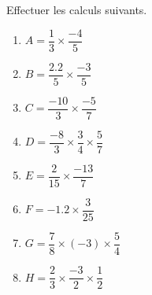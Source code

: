 \begin{exercice*}
    Effectuer les calculs suivants.
    \begin{spacing}{2}
        \begin{multicols}{2}
            \begin{enumerate}
                \item $A=\dfrac{1}{3}\times\dfrac{-4}{5}$
                \item $B=\dfrac{\num{2.2}}{5}\times\dfrac{-3}{5}$
                \item $C=\dfrac{-10}{3}\times\dfrac{-5}{7}$
                \item $D=\dfrac{-8}{3}\times\dfrac{3}{4}\times\dfrac{5}{7}$
                \item $E=\dfrac{2}{15}\times\dfrac{-13}{7}$
                \item $F=\num{-1.2}\times\dfrac{3}{25}$
                \item $G=\dfrac{7}{8}\times (-3)\times\dfrac{5}{4}$
                \item $H=\dfrac{2}{3}\times\dfrac{-3}{2}\times\dfrac{1}{2}$
            \end{enumerate}
        \end{multicols}
    \end{spacing}
\end{exercice*}

